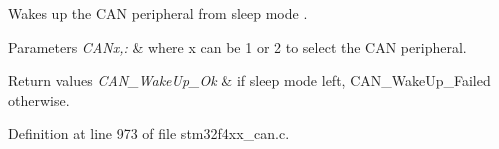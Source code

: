 Wakes up the C\-A\-N peripheral from sleep mode . 


\begin{DoxyParams}{Parameters}
{\em C\-A\-Nx,\-:} & where x can be 1 or 2 to select the C\-A\-N peripheral. \\
\hline
\end{DoxyParams}

\begin{DoxyRetVals}{Return values}
{\em C\-A\-N\-\_\-\-Wake\-Up\-\_\-\-Ok} & if sleep mode left, C\-A\-N\-\_\-\-Wake\-Up\-\_\-\-Failed otherwise. \\
\hline
\end{DoxyRetVals}


Definition at line 973 of file stm32f4xx\-\_\-can.\-c.

